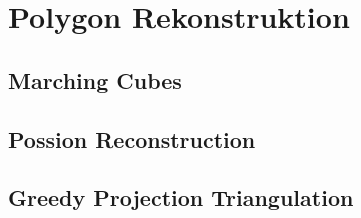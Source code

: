 \section{Polygon Rekonstruktion}

\subsection{Marching Cubes}

\subsection{Possion Reconstruction}

\subsection{Greedy Projection Triangulation}

